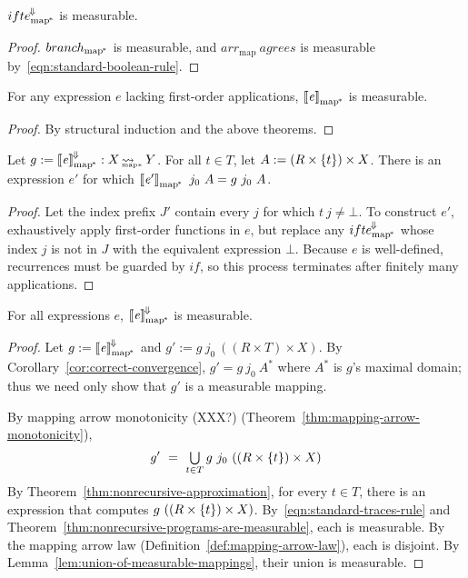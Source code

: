 \documentclass[preprint]{sigplanconf}
\newcommand{\arrow}{\rightsquigarrow}
\newcommand{\conv}{^{\mspace{-2mu}\Downarrow\mspace{-2mu}}}
\newcommand{\meaningofconv}[1]{\left\llbracket{#1}\right\rrbracket\conv}
\newcommand{\arrowarr}{\ensuremath{arr}}
\newcommand{\arrowconvif}{\ensuremath{ifte\conv}}
\newcommand{\map}{_\mathrm{map}}
\newcommand{\arrmap}{\arrowarr\map}
\newcommand{\pmap}{_\mathrm{map^{\mspace{-2mu}*}}}
\DeclareMathOperator{\pmapto}{\arrow_{\mspace{-22mu}_{\mathrm{map*}}}}
\newcommand{\convifpmap}{\arrowconvif\pmap}
\begin{document}
\begin{theorem}
$\convifpmap$ is measurable.
\end{theorem}
\begin{proof}
$branch\pmap$ is measurable, and $\arrmap~agrees$ is measurable by~\eqref{eqn:standard-boolean-rule}.
\end{proof}

\begin{theorem}
For any expression $\mathit{e}$ lacking first-order applications, $\meaningof{\mathit{e}}\pmap$ is measurable.
\label{thm:nonrecursive-programs-are-measurable}
\end{theorem}
\begin{proof}
By structural induction and the above theorems.
\end{proof}

\begin{theorem}
Let $g := \meaningofconv{\mathit{e}}\pmap : X \pmapto Y$.
For all $t \in T$, let $A := (R \times \{{t}\}) \times X$.
There is an expression $\mathit{e'}$ for which $\meaningof{\mathit{e'}}\pmap~j_0~A = g~j_0~A$.
\label{thm:nonrecursive-approximation}
\end{theorem}
\begin{proof}
Let the index prefix $J'$ contain every $j$ for which $t~j \neq \bot$.
To construct $\mathit{e'}$, exhaustively apply first-order functions in $\mathit{e}$, but replace any $\convifpmap$ whose index $j$ is not in $J$ with the equivalent expression $\bot$.
Because $\mathit{e}$ is well-defined, recurrences must be guarded by $if$, so this process terminates after finitely many applications.
\end{proof}

\begin{theorem}
For all expressions $\mathit{e}$, $\meaningofconv{\mathit{e}}\pmap$ is measurable.
\label{thm:everything-is-measurable}
\end{theorem}
\begin{proof}
Let $g := \meaningofconv{\mathit{e}}\pmap$ and $g' := g~j_0~((R \times T) \times X)$.
By Corollary~\ref{cor:correct-convergence}, $g' = g~j_0~A^*$ where $A^*$ is $g$'s maximal domain; thus we need only show that $g'$ is a measurable mapping.

By mapping arrow monotonicity (XXX?) (Theorem~\ref{thm:mapping-arrow-monotonicity}),
\begin{equation}
	g' \ =\ \textstyle\bigcup\limits_{t \in T} g~j_0~((R \times \{{t}\}) \times X)
\end{equation}
By Theorem~\ref{thm:nonrecursive-approximation}, for every $t \in T$, there is an expression that computes $g~((R \times \{{t}\}) \times X)$.
By~\eqref{eqn:standard-traces-rule} and Theorem~\ref{thm:nonrecursive-programs-are-measurable}, each is measurable.
By the mapping arrow law (Definition~\ref{def:mapping-arrow-law}), each is disjoint.
By Lemma~\ref{lem:union-of-measurable-mappings}, their union is measurable.
\end{proof}
\end{document}
